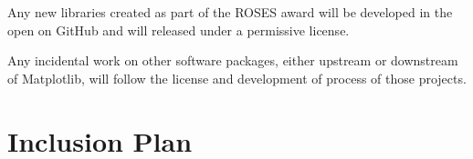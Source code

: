 \documentclass[12pt]{article}
\numberwithin{page}{section}
\begin{document}
Any new libraries created as part of the ROSES award will be developed
in the open on GitHub and will released under a permissive license.

Any incidental work on other software packages, either upstream or
downstream of Matplotlib, will follow the license and development of
process of those projects.

\newpage

\section{Inclusion Plan}
\setcounter{page}{1}

\end{document}
